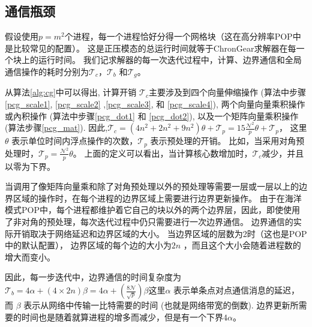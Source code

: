 \subsection{通信瓶颈}
\label{precond:EVP:comm}
  
假设使用$p=m^2$个进程，每一个进程恰好分得一个网格块（这在高分辨率POP中是比较常见的配置）。 
这是正压模态的总运行时间就等于ChronGear求解器在每一个块上的运行时间。 
我们记求解器的每一次迭代过程中，计算、边界通信和全局通信操作的耗时分别为$\mathcal{T}_c$，$\mathcal{T}_b$ 和$\mathcal{T}_g$。 


从算法\ref{alg:cg}中可以得出, 计算开销
$\mathcal{T}_c$主要涉及到四个向量伸缩操作 (算法中步骤\ref{pcg_scale1}, \ref{pcg_scale2} ,\ref{pcg_scale3}, 和
\ref{pcg_scale4}), 两个向量向量乘积操作或內积操作 (算法中步骤\ref{pcg_dot1} 和 \ref{pcg_dot2}), 以及一个矩阵向量乘积操作 (算法步骤\ref{pcg_mat}).  
因此,$\mathcal{T}_c= (4 n^2 +2n^2+ 9n^2)\theta + \mathcal{T}_{p}=15\frac{\mathcal{N}^2}{p}\theta+\mathcal{T}_{p}$，
这里$\theta$ 表示单位时间内浮点操作的次数，$\mathcal{T}_{p}$ 表示预处理的开销。
比如，当采用对角预处理时，$\mathcal{T}_{p} =\frac{\mathcal{N}^2}{p}\theta$。
上面的定义可以看出，当计算核心数增加时，$\mathcal{T}_c$减少，并且以零为下界。

 
当调用了像矩阵向量乘和除了对角预处理以外的预处理等需要一层或一层以上的边界区域的操作时，在每个进程的边界区域上需要进行边界更新操作。 
由于在海洋模式POP中，每个进程都维护着它自己的块以外的两个边界层，因此，即使使用了非对角的预处理，每次迭代过程中仍只需要进行一次边界通信。
边界通信的实际开销取决于网络延迟和边界区域的大小。 当边界区域的层数为2时（这也是POP中的默认配置）， 边界区域的每个边的大小为$2n$ ，而且这个大小会随着进程数的增大而变小。 
 
因此，每一步迭代中，边界通信的时间复杂度为$\mathcal{T}_b =4\alpha +(4\times 2n)\beta=4\alpha +(\frac{8\mathcal{N}}{\sqrt{p}})\beta $这里$\alpha$ 表示单条点对点通信消息的延迟，而
$\beta$ 表示从网络中传输一比特需要的时间 (也就是网络带宽的倒数).
边界更新所需要的时间也是随着就算进程的增多而减少，但是有一个下界$4\alpha$。 



